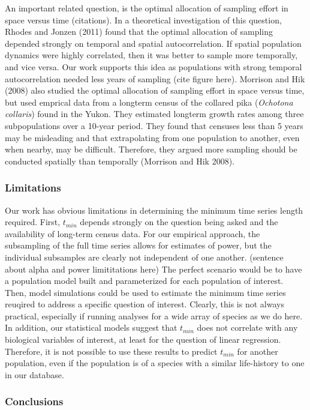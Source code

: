 \documentclass[11pt,]{article}
\begin{document}
An important related question, is the optimal allocation of sampling
effort in space versus time (citations). In a theoretical investigation
of this question, Rhodes and Jonzen (2011) found that the optimal
allocation of sampling depended strongly on temporal and spatial
autocorrelation. If spatial population dynamics were highly correlated,
then it was better to sample more temporally, and vice versa. Our work
supports this idea as populations with strong temporal autocorrelation
needed less years of sampling (cite figure here). Morrison and Hik
(2008) also studied the optimal allocation of sampling effort in space
versus time, but used emprical data from a longterm census of the
collared pika (\emph{Ochotona collaris}) found in the Yukon. They
estimated longterm growth rates among three subpopulations over a
10-year period. They found that censuses less than 5 years may be
misleading and that extrapolating from one population to another, even
when nearby, may be difficult. Therefore, they argued more sampling
should be conducted spatially than temporally (Morrison and Hik 2008).

\subsubsection{Limitations}\label{limitations}

Our work has obvious limitations in determining the minimum time series
length required. First, \(t_{min}\) depends strongly on the question
being asked and the availability of long-term census data. For our
empirical approach, the subsampling of the full time series allows for
estimates of power, but the individual subsamples are clearly not
independent of one another. (sentence about alpha and power
limititations here) The perfect scenario would be to have a population
model built and parameterized for each population of interest. Then,
model simulations could be used to estimate the minimum time series
reuqired to address a specific question of interest. Clearly, this is
not always practical, especially if running analyses for a wide array of
species as we do here. In addition, our statistical models suggest that
\(t_{min}\) does not correlate with any biological variables of
interest, at least for the question of linear regression. Therefore, it
is not possible to use these results to predict \(t_{min}\) for another
population, even if the population is of a species with a similar
life-history to one in our database.

\subsubsection{Conclusions}\label{conclusions}
\end{document}
